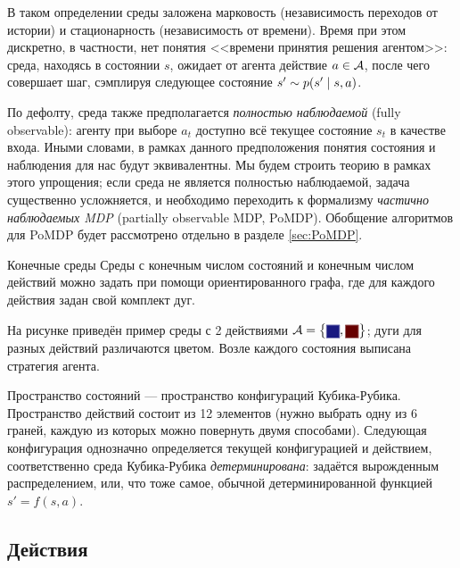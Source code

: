 В таком определении среды заложена марковость (независимость переходов от истории) и стационарность (независимость от времени). Время при этом дискретно, в частности, нет понятия <<времени принятия решения агентом>>: среда, находясь в состоянии $s$, ожидает от агента действие $a \HM\in \A$, после чего совершает шаг, сэмплируя следующее состояние $s' \HM\sim p(s' \HM\mid s, a)$.

По дефолту, среда также предполагается \emph{полностью наблюдаемой} (fully observable): агенту при выборе $a_t$ доступно всё текущее состояние $s_t$ в качестве входа. Иными словами, в рамках данного предположения понятия состояния и наблюдения для нас будут эквивалентны. Мы будем строить теорию в рамках этого упрощения; если среда не является полностью наблюдаемой, задача существенно усложняется, и необходимо переходить к формализму \emph{частично наблюдаемых MDP} (partially observable MDP, PoMDP). Обобщение алгоритмов для PoMDP будет рассмотрено отдельно в разделе \ref{sec:PoMDP}.

\begin{exampleBox}[righthand ratio=0.5, sidebyside, sidebyside align=center, lower separated=false]{Конечные среды}
Среды с конечным числом состояний и конечным числом действий можно задать при помощи ориентированного графа, где для каждого действия задан свой комплект дуг.

На рисунке приведён пример среды с 2 действиями $\A = \bigl\{ \text{\colorsquare{ChadBlue}}, \text{\colorsquare{ChadRed}} \bigr\} $; дуги для разных действий различаются цветом. Возле каждого состояния выписана стратегия агента.

\tcblower
{}
\end{exampleBox}

\begin{example}
Пространство состояний --- пространство конфигураций Кубика-Рубика. Пространство действий состоит из 12 элементов (нужно выбрать одну из 6 граней, каждую из которых можно повернуть двумя способами). Следующая конфигурация однозначно определяется текущей конфигурацией и действием, соответственно среда Кубика-Рубика \emph{детерминирована}: задаётся вырожденным распределением, или, что тоже самое,  обычной детерминированной функцией $s' = f(s, a)$. 
\end{example}

\subsection{Действия}

